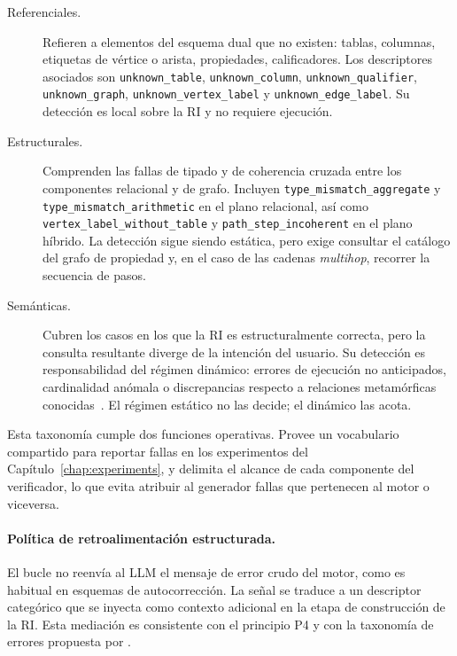 \begin{description}
    \item[Referenciales.] Refieren a elementos del esquema dual que no existen: tablas, columnas, etiquetas de vértice o arista, propiedades, calificadores. Los descriptores asociados son \texttt{unknown\_table}, \texttt{unknown\_column}, \texttt{unknown\_qualifier}, \texttt{unknown\_graph}, \texttt{unknown\_vertex\_label} y \texttt{unknown\_edge\_label}. Su detección es local sobre la \ac{RI} y no requiere ejecución.

    \item[Estructurales.] Comprenden las fallas de tipado y de coherencia cruzada entre los componentes relacional y de grafo. Incluyen \texttt{type\_mismatch\_aggregate} y \texttt{type\_mismatch\_arithmetic} en el plano relacional, así como \texttt{vertex\_label\_without\_table} y \texttt{path\_step\_incoherent} en el plano híbrido. La detección sigue siendo estática, pero exige consultar el catálogo del grafo de propiedad y, en el caso de las cadenas \emph{multihop}, recorrer la secuencia de pasos.

    \item[Semánticas.] Cubren los casos en los que la \ac{RI} es estructuralmente correcta, pero la consulta resultante diverge de la intención del usuario. Su detección es responsabilidad del régimen dinámico: errores de ejecución no anticipados, cardinalidad anómala o discrepancias respecto a relaciones metamórficas conocidas~\cite{ChenTY1998Metamorphic, WrenAI2025}. El régimen estático no las decide; el dinámico las acota.
\end{description}

Esta taxonomía cumple dos funciones operativas. Provee un vocabulario compartido para reportar fallas en los experimentos del Capítulo~\ref{chap:experiments}, y delimita el alcance de cada componente del verificador, lo que evita atribuir al generador fallas que pertenecen al motor o viceversa.

\paragraph{Política de retroalimentación estructurada.} El bucle no reenvía al \ac{LLM} el mensaje de error crudo del motor, como es habitual en esquemas de autocorrección. La señal se traduce a un descriptor categórico que se inyecta como contexto adicional en la etapa de construcción de la \ac{RI}. Esta mediación es consistente con el principio P4 y con la taxonomía de errores propuesta por \cite{errorllm2026}.

